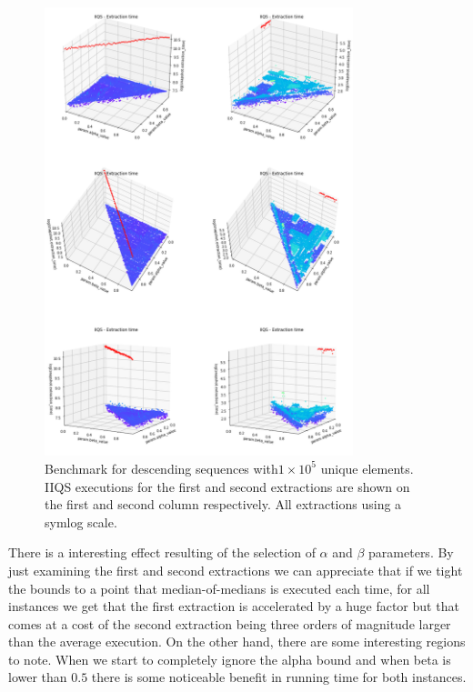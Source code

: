 \begin{figure}[!ht]
    \centering
    \includegraphics[width=0.8\textwidth]{./fragments/04_experimental_execution/images/04_alphabeta_singleclass_desc.png}
    \caption{Benchmark for descending sequences with$1\times10^5$ unique elements. IIQS executions for the first and second extractions are shown on the first and second column respectively. All extractions using a symlog scale.}
    \label{FIG:05_ALPHABETA_RELATIONSHIP_DESC}
\end{figure}


There is a interesting effect resulting of the selection of $\alpha$ and $\beta$ parameters. By just examining the first and second extractions we can appreciate that if we tight the bounds to a point that median-of-medians is executed each time, for all instances we get that the first extraction is accelerated by a huge factor but that comes at a cost of the second extraction being three orders of magnitude larger than the average execution. On the other hand, there are some interesting regions to note. When we start to completely ignore the alpha bound and when beta is lower than $0.5$ there is some noticeable benefit in running time for both instances.


